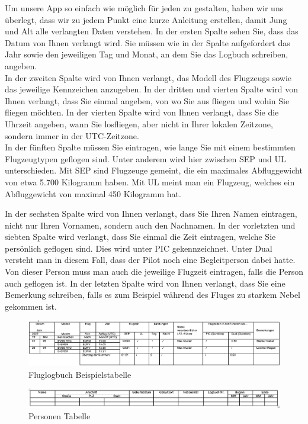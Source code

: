 \documentclass[a4paper]{article} %
\begin{document}
    \noindent Um unsere App so einfach wie möglich für jeden zu gestalten, haben wir uns überlegt, dass wir zu jedem Punkt eine kurze Anleitung erstellen, damit Jung und Alt alle verlangten Daten verstehen. In der ersten Spalte sehen Sie, dass das Datum von Ihnen verlangt wird. Sie müssen wie in der Spalte aufgefordert das Jahr sowie den jeweiligen Tag und Monat, an dem Sie das Logbuch schreiben, angeben. \\
    In der zweiten Spalte wird von Ihnen verlangt, das Modell des Flugzeugs sowie das jeweilige Kennzeichen anzugeben. In der dritten und vierten Spalte wird von Ihnen verlangt, dass Sie einmal angeben, von wo Sie aus fliegen und wohin Sie fliegen möchten. In der vierten Spalte wird von Ihnen verlangt, dass Sie die Uhrzeit angeben, wann Sie losfliegen, aber nicht in Ihrer lokalen Zeitzone, sondern immer in der UTC-Zeitzone.\\ In der fünften Spalte müssen Sie eintragen, wie lange Sie mit einem bestimmten Flugzeugtypen geflogen sind. Unter anderem wird hier zwischen SEP und UL unterschieden. Mit SEP sind Flugzeuge gemeint, die ein maximales Abfluggewicht von etwa 5.700 Kilogramm haben. Mit UL meint man ein Flugzeug, welches ein Abfluggewicht von maximal 450 Kilogramm hat. \\
    
    \pagebreak
    
    \noindent In der sechsten Spalte wird von Ihnen verlangt, dass Sie Ihren Namen eintragen, nicht nur Ihren Vornamen, sondern auch den Nachnamen. In der vorletzten und siebten Spalte wird verlangt, dass Sie einmal die Zeit eintragen, welche Sie persönlich geflogen sind. Dies wird unter PIC gekennzeichnet. Unter Dual versteht man in diesem Fall, dass der Pilot noch eine Begleitperson dabei hatte. Von dieser Person muss man auch die jeweilige Flugzeit eintragen, falls die Person auch geflogen ist. In der letzten Spalte wird von Ihnen verlangt, dass Sie eine Bemerkung schreiben, falls es zum Beispiel während des Fluges zu starkem Nebel gekommen ist.\\
    
    \begin{figure}[h!]
        \centering
        \includegraphics[width=17cm]{Logbuch_Beispiel.png}
        \caption{Fluglogbuch Beispielstabelle}
        \label{fig:my_label}
    \end{figure}
    \begin{figure}[h!]
        \centering
        \includegraphics[width=17cm]{Personen.png}
        \caption{Personen Tabelle}
        \label{fig:my_label}
    \end{figure}
    
\end{document}
